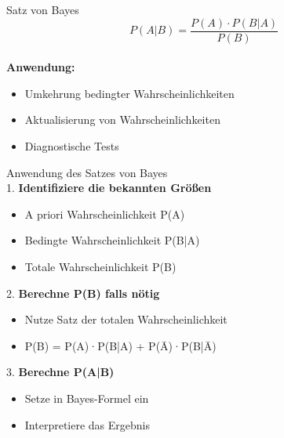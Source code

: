 
\begin{theorem}{Satz von Bayes}
    \vspace{-4mm}\\
$$P(A|B)=\frac{P(A) \cdot P(B|A)}{P(B)}$$
\vspace{-4mm}\\
\textbf{Anwendung:}
\begin{itemize}
    \item Umkehrung bedingter Wahrscheinlichkeiten
    \item Aktualisierung von Wahrscheinlichkeiten
    \item Diagnostische Tests
\end{itemize}
\end{theorem}


\begin{KR}{Anwendung des Satzes von Bayes}\\
1. \textbf{Identifiziere die bekannten Größen}
   \begin{itemize}
   \item A priori Wahrscheinlichkeit P(A)
   \item Bedingte Wahrscheinlichkeit P(B|A)
   \item Totale Wahrscheinlichkeit P(B)
   \end{itemize}

2. \textbf{Berechne P(B) falls nötig}
   \begin{itemize}
   \item Nutze Satz der totalen Wahrscheinlichkeit
   \item P(B) = P(A)·P(B|A) + P(Ā)·P(B|Ā)
   \end{itemize}

3. \textbf{Berechne P(A|B)}
   \begin{itemize}
   \item Setze in Bayes-Formel ein
   \item Interpretiere das Ergebnis
   \end{itemize}
\end{KR}

